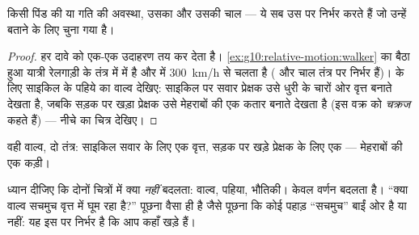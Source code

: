 \begin{proposition}[गति की सापेक्षता]\label{prop:g10:relative-motion:relativity}
किसी पिंड की  या गति की अवस्था, उसका  और उसकी
चाल --- ये सब उस  पर निर्भर करते हैं जो उन्हें
बताने के लिए चुना गया है।
\end{proposition}

\begin{proof}
हर दावे को एक-एक उदाहरण तय कर देता है। \cref{ex:g10:relative-motion:walker} का बैठा हुआ यात्री
रेलगाड़ी के तंत्र में  में है और 
में \qty{300}{km/h} से चलता है ( और चाल तंत्र पर निर्भर हैं)।
 के लिए साइकिल के पहिये का वाल्व देखिए: साइकिल पर सवार
प्रेक्षक उसे धुरी के चारों ओर वृत्त बनाते देखता है, जबकि सड़क पर खड़ा
प्रेक्षक उसे मेहराबों की एक कतार बनाते देखता है (इस वक्र को
\emph{चक्रज} कहते हैं) --- नीचे का चित्र देखिए।
\end{proof}

\begin{omfigure}
\qquad
{}

{\small वही वाल्व, दो तंत्र: साइकिल सवार के लिए एक वृत्त, सड़क पर खड़े
प्रेक्षक के लिए एक  --- मेहराबों की एक कड़ी।}
\end{omfigure}

\begin{remark}
ध्यान दीजिए कि दोनों चित्रों में क्या \emph{नहीं} बदलता: वाल्व,
पहिया, भौतिकी। केवल वर्णन बदलता है। ``क्या वाल्व सचमुच वृत्त में घूम रहा
है?'' पूछना वैसा ही है जैसे पूछना कि कोई पहाड़ ``सचमुच'' बाईं ओर है या
नहीं: यह इस पर निर्भर है कि आप कहाँ खड़े हैं।
\end{remark}

